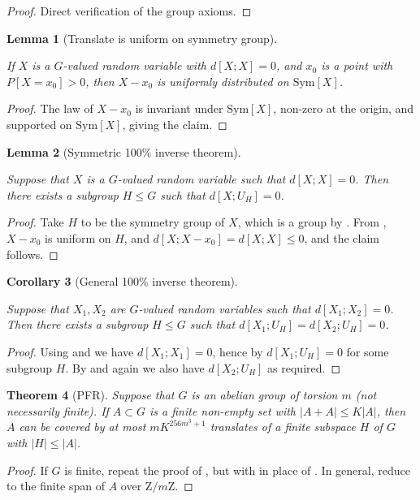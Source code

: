 \documentclass[10pt,a4paper]{article}
\newtheorem{theorem}{Theorem}
\newtheorem{lemma}[theorem]{Lemma}
\newtheorem{corollary}[theorem]{Corollary}
\newcommand{\lean}[1]{}
\newcommand{\uses}[1]{}
\newcommand{\leanok}{}
\begin{document}
\begin{proof}\leanok Direct verification of the group axioms.
\end{proof}


\begin{lemma}[Translate is uniform on symmetry group]\label{sym-zero}
\lean{isUniform_sub_const_of_rdist_eq_zero}\leanok
  If $X$ is a $G$-valued random variable with $d[X ;X]=0$, and $x_0$ is a point with $P[X=x_0] > 0$, then $X-x_0$ is uniformly distributed on $\mathrm{Sym}[X]$.
\end{lemma}

\begin{proof}\uses{zero-large,sym-group-def,uniform-def}\leanok  The law of $X-x_0$ is invariant under $\mathrm{Sym}[X]$, non-zero at the origin, and supported on  $\mathrm{Sym}[X]$, giving the claim.
\end{proof}


\begin{lemma}[Symmetric 100\% inverse theorem]\label{lem:100pc-self}
  \lean{exists_isUniform_of_rdist_self_eq_zero}\leanok
  Suppose that $X$ is a $G$-valued random variable such that
  $d[X ;X]=0$. Then there exists a subgroup $H \leq G$ such that $d[X ;U_H] = 0$.
\end{lemma}

\begin{proof}\uses{sym-group, sym-zero}\leanok
Take $H$ to be the symmetry group of $X$, which is a group by . From , $X-x_0$ is uniform on $H$, and $d[X ;X-x_0] = d[X ;X] \leq 0$, and the claim follows.
\end{proof}

\begin{corollary}[General 100\% inverse theorem]\label{lem:100pc}
  \lean{exists_isUniform_of_rdist_eq_zero}\leanok
  Suppose that $X_1,X_2$ are $G$-valued random variables such that
  $d[X_1;X_2]=0$. Then there exists a subgroup $H \leq G$ such that $d[X_1;U_H] = d[X_2;U_H] = 0$.
\end{corollary}

\begin{proof}\uses{lem:100pc-self,ruzsa-triangle, ruzsa-nonneg}\leanok
Using  and  we have $d[X_1;X_1]=0$, hence by  $d[X_1;U_H]=0$ for some subgroup $H$.  By  and  again we also have $d[X_2;U_H]$ as required.
\end{proof}

\begin{theorem}[PFR]\label{pfr-torsion}\lean{torsion_PFR}\leanok  Suppose that $G$ is an abelian group of torsion $m$ (not necessarily finite).
  If $A \subset G$ is a finite non-empty set with $|A+A| \leq K|A|$, then $A$ can be covered by at most $mK^{256m^3+1}$ translates of a finite subspace $H$ of $G$ with $|H| \leq |A|$.
  \end{theorem}

  \begin{proof}\uses{pfr_aux_torsion}\leanok If $G$ is finite, repeat the proof of , but with  in place of . In general, reduce to the finite span of $A$ over $\mathrm{Z}/m\mathrm{Z}$.
  \end{proof}
\end{document}
